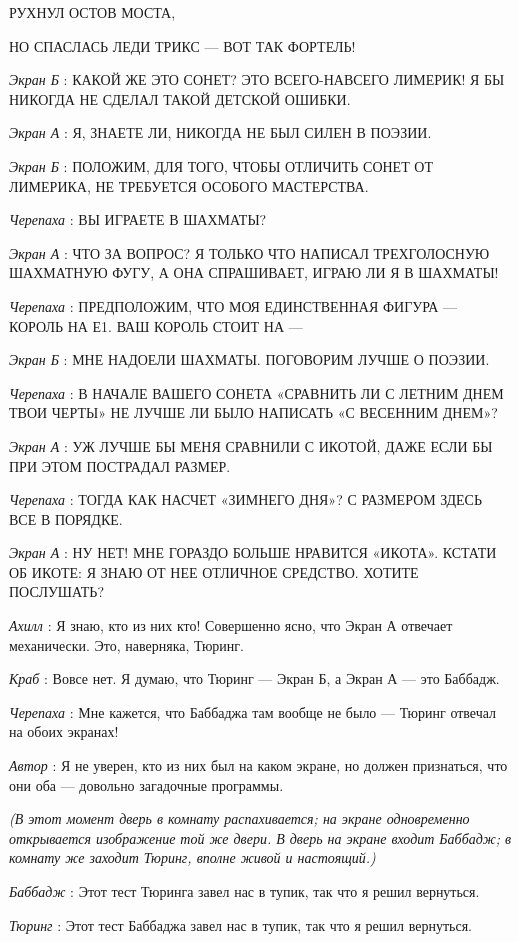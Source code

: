 РУХНУЛ ОСТОВ МОСТА,

НО СПАСЛАСЬ ЛЕДИ ТРИКС --- ВОТ ТАК ФОРТЕЛЬ!

\emph{Экран Б} : КАКОЙ ЖЕ ЭТО СОНЕТ? ЭТО ВСЕГО-НАВСЕГО ЛИМЕРИК! Я БЫ НИКОГДА НЕ СДЕЛАЛ ТАКОЙ ДЕТСКОЙ ОШИБКИ.

\emph{Экран А} : Я, ЗНАЕТЕ ЛИ, НИКОГДА НЕ БЫЛ СИЛЕН В ПОЭЗИИ.

\emph{Экран Б} : ПОЛОЖИМ, ДЛЯ ТОГО, ЧТОБЫ ОТЛИЧИТЬ СОНЕТ ОТ ЛИМЕРИКА, НЕ ТРЕБУЕТСЯ ОСОБОГО МАСТЕРСТВА.

\emph{Черепаха} : ВЫ ИГРАЕТЕ В ШАХМАТЫ?

\emph{Экран А} : ЧТО ЗА ВОПРОС? Я ТОЛЬКО ЧТО НАПИСАЛ ТРЕХГОЛОСНУЮ ШАХМАТНУЮ ФУГУ, А ОНА СПРАШИВАЕТ, ИГРАЮ ЛИ Я В ШАХМАТЫ!

\emph{Черепаха} : ПРЕДПОЛОЖИМ, ЧТО МОЯ ЕДИНСТВЕННАЯ ФИГУРА --- КОРОЛЬ НА Е1. ВАШ КОРОЛЬ СТОИТ НА ---

\emph{Экран Б} : МНЕ НАДОЕЛИ ШАХМАТЫ. ПОГОВОРИМ ЛУЧШЕ О ПОЭЗИИ.

\emph{Черепаха} : В НАЧАЛЕ ВАШЕГО СОНЕТА «СРАВНИТЬ ЛИ С ЛЕТНИМ ДНЕМ ТВОИ ЧЕРТЫ» НЕ ЛУЧШЕ ЛИ БЫЛО НАПИСАТЬ «С ВЕСЕННИМ ДНЕМ»?

\emph{Экран А} : УЖ ЛУЧШЕ БЫ МЕНЯ СРАВНИЛИ С ИКОТОЙ, ДАЖЕ ЕСЛИ БЫ ПРИ ЭТОМ ПОСТРАДАЛ РАЗМЕР.

\emph{Черепаха} : ТОГДА КАК НАСЧЕТ «ЗИМНЕГО ДНЯ»? С РАЗМЕРОМ ЗДЕСЬ ВСЕ В ПОРЯДКЕ.

\emph{Экран А} : НУ НЕТ! МНЕ ГОРАЗДО БОЛЬШЕ НРАВИТСЯ «ИКОТА». КСТАТИ ОБ ИКОТЕ: Я ЗНАЮ ОТ НЕЕ ОТЛИЧНОЕ СРЕДСТВО. ХОТИТЕ ПОСЛУШАТЬ?

\emph{Ахилл} : Я знаю, кто из них кто! Совершенно ясно, что Экран А отвечает механически. Это, наверняка, Тюринг.

\emph{Краб} : Вовсе нет. Я думаю, что Тюринг --- Экран Б, а Экран А --- это Баббадж.

\emph{Черепаха} : Мне кажется, что Баббаджа там вообще не было --- Тюринг отвечал на обоих экранах!

\emph{Автор} : Я не уверен, кто из них был на каком экране, но должен признаться, что они оба --- довольно загадочные программы.

\emph{(В этот момент дверь в комнату распахивается; на экране одновременно открывается изображение той же двери. В дверь на экране входит Баббадж; в комнату же заходит Тюринг, вполне живой и настоящий.)}

\emph{Баббадж} : Этот тест Тюринга завел нас в тупик, так что я решил вернуться.

\emph{Тюринг} : Этот тест Баббаджа завел нас в тупик, так что я решил вернуться.


